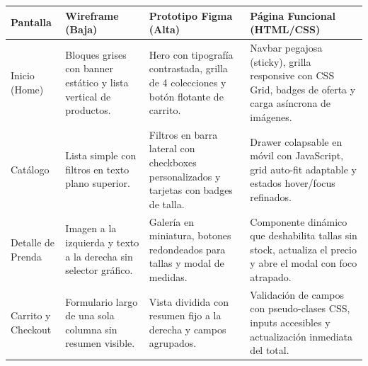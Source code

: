\documentclass[12pt]{article}
\begin{document}
\begin{table}[H]
\centering
\small
\renewcommand{\arraystretch}{1.3}
\begin{tabularx}{\textwidth}{|>{\raggedright\arraybackslash}p{}|>{\raggedright\arraybackslash}p{}|>{\raggedright\arraybackslash}p{}|X|}
\hline
\textbf{Pantalla} & \textbf{Wireframe (Baja)} & \textbf{Prototipo Figma (Alta)} & \textbf{Página Funcional (HTML/CSS)} \\ \hline
Inicio (Home) & Bloques grises con banner estático y lista vertical de productos. & Hero con tipografía contrastada, grilla de 4 colecciones y botón flotante de carrito. & Navbar pegajosa (sticky), grilla responsive con CSS Grid, badges de oferta y carga asíncrona de imágenes. \\ \hline
Catálogo & Lista simple con filtros en texto plano superior. & Filtros en barra lateral con checkboxes personalizados y tarjetas con badges de talla. & Drawer colapsable en móvil con JavaScript, grid auto-fit adaptable y estados hover/focus refinados. \\ \hline
Detalle de Prenda & Imagen a la izquierda y texto a la derecha sin selector gráfico. & Galería en miniatura, botones redondeados para tallas y modal de medidas. & Componente dinámico que deshabilita tallas sin stock, actualiza el precio y abre el modal con foco atrapado. \\ \hline
Carrito y Checkout & Formulario largo de una sola columna sin resumen visible. & Vista dividida con resumen fijo a la derecha y campos agrupados. & Validación de campos con pseudo-clases CSS, inputs accesibles y actualización inmediata del total. \\ \hline
\end{tabularx}
\end{table}
\end{document}
